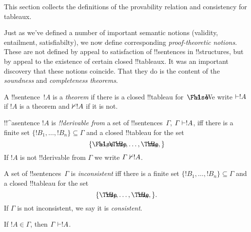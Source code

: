 \documentclass[../../../include/open-logic-section]{subfiles}
\begin{document}
      {}
      {}
      

\begin{editorial}
This section collects the definitions of the provability relation
and consistency for tableaux.
\end{editorial}

\begin{explain}
Just as we've defined a number of important semantic notions
(validity, entailment, satisfiabilty), we now define corresponding
\emph{proof-theoretic notions}.  These are not defined by appeal to
satisfaction of !!{sentence}s in !!{structure}s, but by appeal to the
existence of certain closed !!{tableau}x.  It was an important
discovery that these notions coincide.  That they do is the content of
the \emph{soundness} and \emph{completeness theorems}.
\end{explain}


\begin{defn}[Theorems]
A !!{sentence}~$!A$ is a \emph{theorem} if there is a closed
!!{tableau} for~$\sFmla{\False}{!A}$.  We write $\Proves !A$ if $!A$
is a theorem and $\Proves/ !A$ if it is not.
\end{defn}

\begin{defn}[!!^{derivability}]
!!^a{sentence} $!A$ is \emph{!!{derivable} from} a set of
!!{sentence}s~$\Gamma$, $\Gamma \Proves !A$, iff there is a
finite set $\{!B_1, \dots, !B_n\} \subseteq \Gamma$
and a closed !!{tableau} for the set
\[
\{
  \sFmla{\False}{!A},
  \sFmla{\True}{!B_1}, \dots,
  \sFmla{\True}{!B_n},  
  \}
\]
If $!A$ is not !!{derivable} from $\Gamma$ we write $\Gamma \Proves/
!A$.
\end{defn}

\begin{defn}[Consistency]
A set of !!{sentence}s~$\Gamma$ is \emph{inconsistent} iff there is a
finite set $\{!B_1, \dots, !B_n\} \subseteq \Gamma$ and a closed
!!{tableau} for the set
\[
\{
  \sFmla{\True}{!B_1}, \dots,
  \sFmla{\True}{!B_n},  
  \}.
\]
If $\Gamma$ is not inconsistent, we say it is \emph{consistent}.
\end{defn}

\begin{prop}[Reflexivity]
If $!A \in \Gamma$, then $\Gamma \Proves !A$.
\end{prop}
\end{document}
